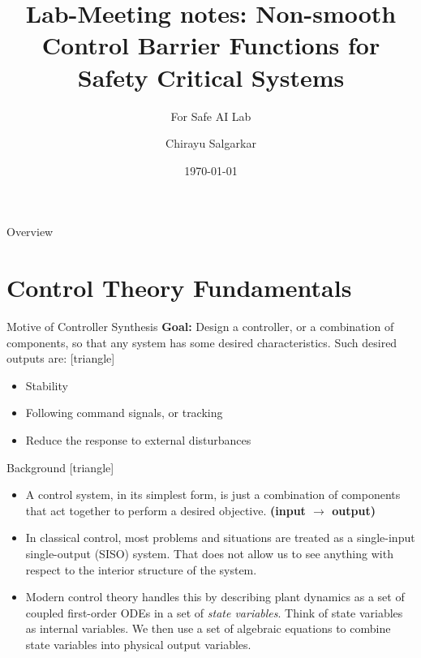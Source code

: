 \documentclass[aspectratio=169,xcolor=dvipsnames]{beamer}
\title[short title]{Lab-Meeting notes: Non-smooth Control Barrier Functions for Safety Critical Systems}
\subtitle{For Safe AI Lab}
\author{Chirayu Salgarkar}
\institute[Mercer] %
{
    Safe AI Lab, RIT \\

    \vskip 3pt
}
\date{\today} %
\begin{document}
\begin{frame}
    \titlepage
\end{frame}

\begin{frame}{Overview}
    \tableofcontents
\end{frame}

\section{Control Theory Fundamentals}

\begin{frame}{Motive of Controller Synthesis}
\textbf{Goal:} Design a controller, or a combination of components, so that any system has some desired characteristics.
\bigbreak
  Such desired outputs are:
  [triangle]
  \begin{itemize}
  \item Stability
  \item Following command signals, or tracking
  \item Reduce the response to external disturbances
  \end{itemize}  
\end{frame}
   
\begin{frame}{Background}  
  [triangle]
  \begin{itemize}
    \item A control system, in its simplest form, is just a combination of components that act together to perform a desired objective. \textbf{(input $\to$ output)}
   \item In classical control, most problems and situations are treated as a single-input single-output (SISO) system. That does not allow us to see anything with respect to the interior structure of the system. 
    \item Modern control theory handles this by describing plant dynamics as a set of coupled first-order ODEs in a set of \textit{state variables}. Think of state variables as internal variables. We then use a set of algebraic equations to combine state variables into physical output variables. 
  \end{itemize}
\end{frame}

\end{document}
